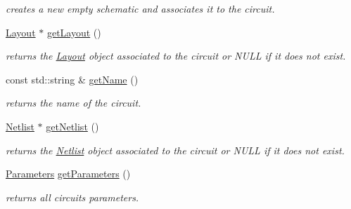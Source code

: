 \begin{DoxyCompactItemize}
\begin{DoxyCompactList}\small\item\em creates a new empty schematic and associates it to the circuit. \end{DoxyCompactList}\item 
\mbox{\label{class_open_chams_1_1_circuit_a403a908943f9a3e820fd25a86d00531d}} 
\hyperlink{class_open_chams_1_1_layout}{Layout} $\ast$ \hyperlink{class_open_chams_1_1_circuit_a403a908943f9a3e820fd25a86d00531d}{get\+Layout} ()
\begin{DoxyCompactList}\small\item\em returns the \hyperlink{class_open_chams_1_1_layout}{Layout} object associated to the circuit or N\+U\+LL if it does not exist. \end{DoxyCompactList}\item 
\mbox{\label{class_open_chams_1_1_circuit_a2858c0c4e8b5108f041237cf5a802029}} 
const std\+::string \& \hyperlink{class_open_chams_1_1_circuit_a2858c0c4e8b5108f041237cf5a802029}{get\+Name} ()
\begin{DoxyCompactList}\small\item\em returns the name of the circuit. \end{DoxyCompactList}\item 
\mbox{\label{class_open_chams_1_1_circuit_a4085d6a7b6958ffdd7ab5df7e6d6e53f}} 
\hyperlink{class_open_chams_1_1_netlist}{Netlist} $\ast$ \hyperlink{class_open_chams_1_1_circuit_a4085d6a7b6958ffdd7ab5df7e6d6e53f}{get\+Netlist} ()
\begin{DoxyCompactList}\small\item\em returns the \hyperlink{class_open_chams_1_1_netlist}{Netlist} object associated to the circuit or N\+U\+LL if it does not exist. \end{DoxyCompactList}\item 
\mbox{\label{class_open_chams_1_1_circuit_a2e51ad4344607fc279c5c8cda4edae02}} 
\hyperlink{class_open_chams_1_1_parameters}{Parameters} \hyperlink{class_open_chams_1_1_circuit_a2e51ad4344607fc279c5c8cda4edae02}{get\+Parameters} ()
\begin{DoxyCompactList}\small\item\em returns all circuit\textquotesingle{}s parameters. \end{DoxyCompactList}\item 

\end{DoxyCompactItemize}
